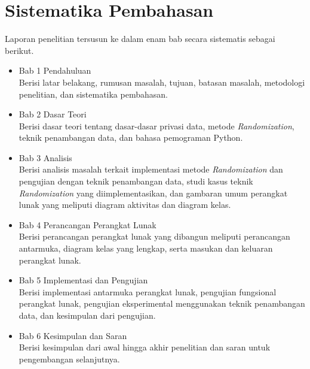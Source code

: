 \section{Sistematika Pembahasan}
\label{sec:sispem}
Laporan penelitian tersusun ke dalam enam bab secara sistematis sebagai berikut.
\begin{itemize}
    \item Bab 1 Pendahuluan\\
    Berisi latar belakang, rumusan masalah, tujuan, batasan masalah, metodologi penelitian, dan sistematika pembahasan.
    \item Bab 2 Dasar Teori\\
    Berisi dasar teori tentang dasar-dasar privasi data, metode \textit{Randomization}, teknik penambangan data, dan bahasa pemograman Python.
    \item Bab 3 Analisis\\
    Berisi analisis masalah terkait implementasi metode \textit{Randomization} dan pengujian dengan teknik penambangan data, studi kasus teknik \textit{Randomization} yang diimplementasikan, dan gambaran umum perangkat lunak yang meliputi diagram aktivitas dan diagram kelas.
    \item Bab 4 Perancangan Perangkat Lunak\\
    Berisi perancangan perangkat lunak yang dibangun meliputi perancangan antarmuka, diagram kelas yang lengkap, serta masukan dan keluaran perangkat lunak.
    \item Bab 5 Implementasi dan Pengujian\\
    Berisi implementasi antarmuka perangkat lunak, pengujian fungsional perangkat lunak, pengujian eksperimental menggunakan teknik penambangan data, dan kesimpulan dari pengujian.
    \item Bab 6 Kesimpulan dan Saran\\
    Berisi kesimpulan dari awal hingga akhir penelitian dan saran untuk pengembangan selanjutnya.
\end{itemize}